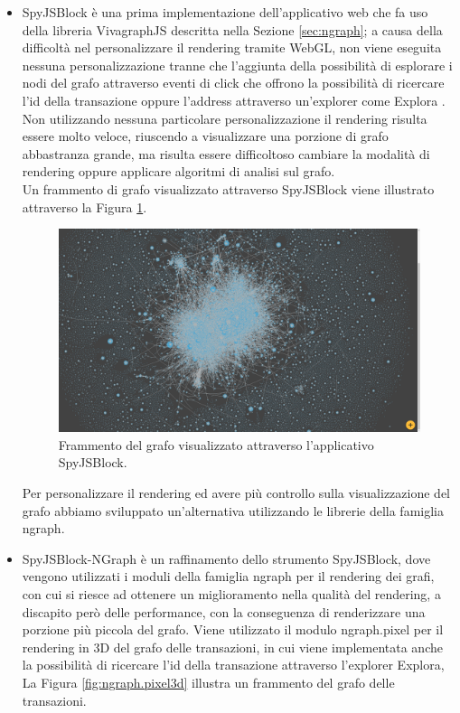 \begin{itemize}
  \item SpyJSBlock è una prima implementazione dell'applicativo web che fa uso della libreria VivagraphJS descritta nella Sezione \ref{sec:ngraph}; a causa  della difficoltà nel personalizzare il rendering tramite WebGL, non viene eseguita nessuna personalizzazione tranne che l'aggiunta della possibilità di esplorare i nodi del grafo attraverso eventi di click che offrono la possibilità di ricercare l'id della transazione oppure l'address attraverso un'explorer come Explora \cite{blockstream:esplora}.\\
  Non utilizzando nessuna particolare personalizzazione il rendering risulta essere molto veloce, riuscendo a visualizzare una porzione di grafo abbastranza grande, ma risulta essere difficoltoso cambiare la modalità di rendering oppure applicare algoritmi di analisi sul grafo.\\
  Un frammento di grafo visualizzato attraverso SpyJSBlock viene illustrato attraverso la Figura \ref{fig:vivagraphSpyJSBlock}.

  \begin{figure}
  \centering
   \includegraphics[scale=0.2]{images/demo/vivagraph.png}
   \caption{Frammento del grafo visualizzato attraverso l'applicativo SpyJSBlock.}\label{fig:vivagraphSpyJSBlock}
  \end{figure}

  Per personalizzare il rendering ed avere più controllo sulla visualizzazione del grafo abbiamo sviluppato un'alternativa utilizzando le librerie della famiglia ngraph.
  \item SpyJSBlock-NGraph è un raffinamento dello strumento SpyJSBlock, dove vengono utilizzati i moduli della famiglia ngraph per il rendering dei grafi, con cui si riesce ad ottenere un miglioramento nella qualità del rendering, a discapito però delle performance, con la conseguenza di renderizzare una porzione più piccola del grafo.
  Viene utilizzato il modulo ngraph.pixel per il rendering in 3D del grafo delle transazioni, in cui viene implementata anche la possibilità di ricercare l'id della transazione attraverso l'explorer Explora, La Figura \ref{fig:ngraph.pixel3d} illustra un frammento del grafo delle transazioni.


\end{itemize}
